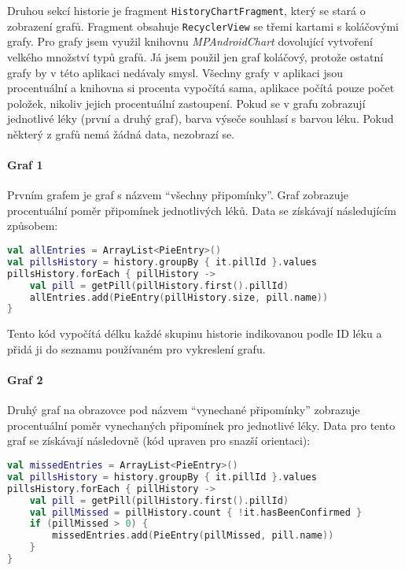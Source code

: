 \documentclass[../TakeYourPill.tex]{subfiles}
\begin{document}
Druhou sekcí historie je fragment \texttt{HistoryChartFragment}, který se stará o zobrazení grafů. Fragment obsahuje \texttt{RecyclerView} se třemi kartami s koláčovými grafy. Pro grafy jsem využil knihovnu \textit{MPAndroidChart} \cite{chart} dovolující vytvoření velkého množství typů grafů. Já jsem použil jen graf koláčový, protože ostatní grafy by v této aplikaci nedávaly smysl. Všechny grafy v aplikaci jsou procentuální a knihovna si procenta vypočítá sama, aplikace počítá pouze počet položek, nikoliv jejich procentuální zastoupení. Pokud se v grafu zobrazují jednotlivé léky (první a druhý graf), barva výseče souhlasí s barvou léku. Pokud některý z grafů nemá žádná data, nezobrazí se.

\paragraph{Graf 1} Prvním grafem je graf s názvem \enquote{všechny připomínky}. Graf zobrazuje procentuální poměr připomínek jednotlivých léků. Data se získávají následujícím způsobem:

\setmonofont{JetBrains Mono}
\begin{lstlisting}[language=Kotlin]
val allEntries = ArrayList<PieEntry>()
val pillsHistory = history.groupBy { it.pillId }.values
pillsHistory.forEach { pillHistory ->
    val pill = getPill(pillHistory.first().pillId)
    allEntries.add(PieEntry(pillHistory.size, pill.name))
}
\end{lstlisting}
\setmonofont{Latin Modern Mono}

Tento kód vypočítá délku každé skupinu historie indikovanou podle ID léku a přidá ji do seznamu používaném pro vykreslení grafu.


\paragraph{Graf 2} Druhý graf na obrazovce pod názvem \enquote{vynechané připomínky} zobrazuje procentuální poměr vynechaných připomínek pro jednotlivé léky. Data pro tento graf se získávají následovně (kód upraven pro snazší orientaci):

\setmonofont{JetBrains Mono}
\begin{lstlisting}[language=Kotlin]
val missedEntries = ArrayList<PieEntry>()
val pillsHistory = history.groupBy { it.pillId }.values
pillsHistory.forEach { pillHistory ->
    val pill = getPill(pillHistory.first().pillId)
    val pillMissed = pillHistory.count { !it.hasBeenConfirmed }
    if (pillMissed > 0) {
        missedEntries.add(PieEntry(pillMissed, pill.name))
    }
}
\end{lstlisting}
\setmonofont{Latin Modern Mono}
\end{document}
